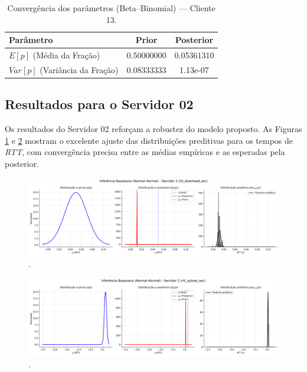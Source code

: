 \documentclass{article}
\begin{document}
\begin{table}[htp]
	\centering
	\caption{Convergência dos parâmetros (Beta–Binomial) — Cliente 13.}
	\label{tab:bayes_beta_client13}
	\begin{tabular}{lcc}
		\hline
		\textbf{Parâmetro} & \textbf{Prior} & \textbf{Posterior} \\ \hline
		$E[p]$ (Média da Fração) & 0.50000000 & 0.05361310 \\
		$Var[p]$ (Variância da Fração) & 0.08333333 & 1.13e-07 \\ \hline
	\end{tabular}
\end{table}

\subsection{Resultados para o Servidor 02}

Os resultados do Servidor 02 reforçam a robustez do modelo proposto. As Figuras
\ref{fig:rtt_download_sec_bayesian_normalnormal_server02} e
\ref{fig:rtt_upload_sec_bayesian_normalnormal_server02} mostram o excelente ajuste
das distribuições preditivas para os tempos de \textit{RTT}, com convergência precisa
entre as médias empíricas e as esperadas pela posterior.

\begin{figure}[htp]
	\centering
	\includegraphics[width=\textwidth]{../figures/bayes/rtt_download_sec_bayesian_normalnormal_server02.png}
	\caption{.}
	\label{fig:rtt_download_sec_bayesian_normalnormal_server02}
\end{figure}
\begin{figure}[htp]
	\centering
	\includegraphics[width=\textwidth]{../figures/bayes/rtt_upload_sec_bayesian_normalnormal_server02.png}
	\caption{.}
	\label{fig:rtt_upload_sec_bayesian_normalnormal_server02}
\end{figure}
\end{document}
